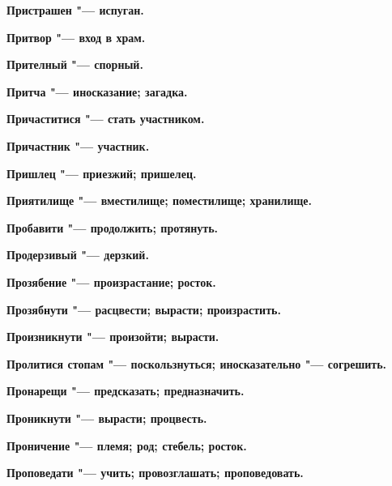 \begin{multicols}{2}
\bfseries Пристрашен\normalfont{} "--- испуган. 




\bfseries Притвор\normalfont{} "--- вход в храм. 




\bfseries Прителный\normalfont{} "--- спорный. 




\bfseries Притча\normalfont{} "--- иносказание; загадка. 




\bfseries Причаститися\normalfont{} "--- стать участником. 




\bfseries Причастник\normalfont{} "--- участник. 




\bfseries Пришлец\normalfont{} "--- приезжий; пришелец. 




\bfseries Приятилище\normalfont{} "--- вместилище; поместилище; хранилище. 




\bfseries Пробавити\normalfont{} "--- продолжить; протянуть. 




\bfseries Продерзивый\normalfont{} "--- дерзкий. 




\bfseries Прозябение\normalfont{} "--- произрастание; росток. 




\bfseries Прозябнути\normalfont{} "--- расцвести; вырасти; произрастить. 




\bfseries Произникнути\normalfont{} "--- произойти; вырасти. 




\bfseries Пролитися стопам\normalfont{} "--- поскользнуться; иносказательно "--- согрешить. 




\bfseries Пронарещи\normalfont{} "--- предсказать; предназначить. 




\bfseries Проникнути\normalfont{} "--- вырасти; процвесть. 




\bfseries Проничение\normalfont{} "--- племя; род; стебель; росток. 




\bfseries Проповедати\normalfont{} "--- учить; провозглашать; проповедовать. 





\end{multicols}
